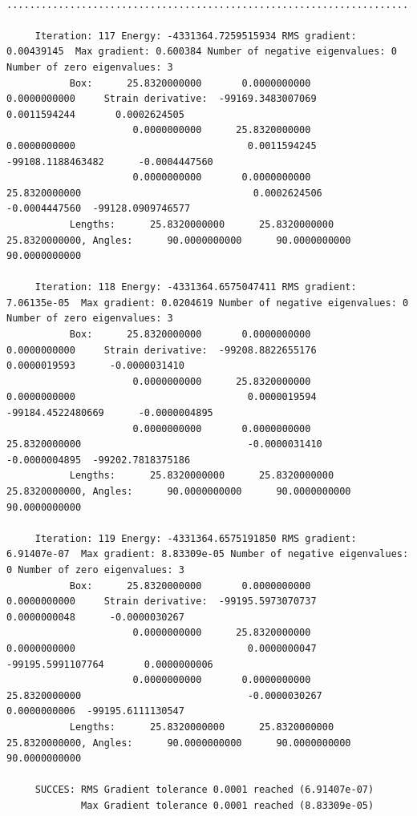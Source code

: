 \begin{tiny}
\begin{verbatim}
     ..........................................................................

     Iteration: 117 Energy: -4331364.7259515934 RMS gradient: 0.00439145  Max gradient: 0.600384 Number of negative eigenvalues: 0 Number of zero eigenvalues: 3
           Box:      25.8320000000       0.0000000000       0.0000000000     Strain derivative:  -99169.3483007069       0.0011594244       0.0002624505
                      0.0000000000      25.8320000000       0.0000000000                              0.0011594245  -99108.1188463482      -0.0004447560
                      0.0000000000       0.0000000000      25.8320000000                              0.0002624506      -0.0004447560  -99128.0909746577
           Lengths:      25.8320000000      25.8320000000      25.8320000000, Angles:      90.0000000000      90.0000000000      90.0000000000

     Iteration: 118 Energy: -4331364.6575047411 RMS gradient: 7.06135e-05  Max gradient: 0.0204619 Number of negative eigenvalues: 0 Number of zero eigenvalues: 3
           Box:      25.8320000000       0.0000000000       0.0000000000     Strain derivative:  -99208.8822655176       0.0000019593      -0.0000031410
                      0.0000000000      25.8320000000       0.0000000000                              0.0000019594  -99184.4522480669      -0.0000004895
                      0.0000000000       0.0000000000      25.8320000000                             -0.0000031410      -0.0000004895  -99202.7818375186
           Lengths:      25.8320000000      25.8320000000      25.8320000000, Angles:      90.0000000000      90.0000000000      90.0000000000

     Iteration: 119 Energy: -4331364.6575191850 RMS gradient: 6.91407e-07  Max gradient: 8.83309e-05 Number of negative eigenvalues: 0 Number of zero eigenvalues: 3
           Box:      25.8320000000       0.0000000000       0.0000000000     Strain derivative:  -99195.5973070737       0.0000000048      -0.0000030267
                      0.0000000000      25.8320000000       0.0000000000                              0.0000000047  -99195.5991107764       0.0000000006
                      0.0000000000       0.0000000000      25.8320000000                             -0.0000030267       0.0000000006  -99195.6111130547
           Lengths:      25.8320000000      25.8320000000      25.8320000000, Angles:      90.0000000000      90.0000000000      90.0000000000

     SUCCES: RMS Gradient tolerance 0.0001 reached (6.91407e-07)
             Max Gradient tolerance 0.0001 reached (8.83309e-05)


\end{verbatim}
\end{tiny}
